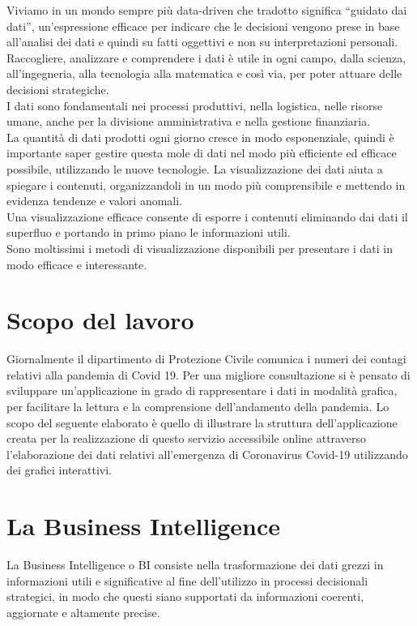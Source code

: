 
Viviamo in un mondo sempre più data-driven che tradotto significa “guidato dai dati”, un’espressione efficace per indicare che le decisioni vengono prese in base all’analisi dei dati e quindi su fatti oggettivi e non su interpretazioni personali.
Raccogliere, analizzare e comprendere i dati è utile in ogni campo, dalla scienza, all'ingegneria, alla tecnologia alla matematica e così via, per poter attuare delle decisioni strategiche.\\
I dati sono fondamentali nei processi produttivi, nella logistica, nelle risorse umane, anche per la divisione amministrativa e nella gestione finanziaria.\\
La quantità di dati prodotti ogni giorno cresce in modo esponenziale, quindi è importante saper gestire questa mole di dati nel modo più efficiente ed efficace possibile, utilizzando le nuove tecnologie.
La visualizzazione dei dati aiuta a spiegare i contenuti, organizzandoli in un modo più comprensibile e mettendo in evidenza tendenze e valori anomali.\\
Una visualizzazione efficace consente di esporre i contenuti eliminando dai dati il superfluo e portando in primo piano le informazioni utili.\\
Sono moltissimi i metodi di visualizzazione disponibili per presentare i dati in modo efficace e interessante.


\section{Scopo del lavoro}

Giornalmente il dipartimento di Protezione Civile comunica i numeri dei contagi relativi alla pandemia di Covid 19.
Per una migliore consultazione si è pensato di sviluppare un’applicazione in grado di rappresentare i dati in modalità grafica, per facilitare la lettura e la comprensione dell’andamento della pandemia.
Lo scopo del seguente elaborato è quello di illustrare la struttura dell'applicazione creata per la realizzazione di questo servizio accessibile online attraverso l’elaborazione dei dati relativi all’emergenza di Coronavirus Covid-19 utilizzando dei grafici interattivi.

\section{La Business Intelligence}
\noindent La Business Intelligence o BI consiste nella trasformazione dei dati grezzi in informazioni utili e significative al fine dell’utilizzo in processi decisionali strategici, in modo che questi siano supportati da informazioni coerenti, aggiornate e altamente precise.
 
